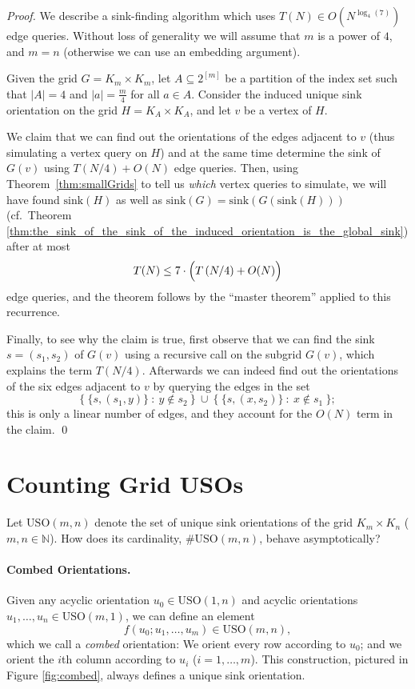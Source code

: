 \documentclass[runningheads,a4paper]{llncs}
\newcommand{\USO}{\ensuremath{\mathrm{USO}}}
\newcommand{\sink}{\ensuremath{\mathrm{sink}}}
\begin{document}
\begin{proof}
    We describe a sink-finding algorithm which uses
    $T(N) \in O(N ^ {\log_4(7)})$ edge queries.
    Without loss of generality we will assume that $m$ is a power of $4$, and
    $m=n$ (otherwise we can use an embedding argument).

    Given the grid $G = K_m \times K_m$, let $A \subseteq 2 ^ {[m]}$
    be a partition of the index set such that
    $|A| = 4$ and $|a| = \frac{m}{4}$ for all $a \in A$.
    Consider the induced unique sink orientation on the grid
    $H = K_A \times K_A$, and let $v$ be a vertex of $H$.

    We claim that we can find out the orientations of the edges adjacent to
    $v$ (thus simulating a vertex query on $H$)
    and at the same time determine the sink of $G(v)$ using
    $T( N/4 ) + O(N)$
    edge queries.
    Then, using Theorem~\ref{thm:smallGrids} to tell us \emph{which} vertex
    queries to simulate, we will have found $\sink(H)$ as well as
    $\sink(G) = \sink(G(\sink(H)))$ (cf.~Theorem
    \ref{thm:the_sink_of_the_sink_of_the_induced_orientation_is_the_global_sink})
    after at most
    \[
        T(N) \le 7 \cdot \Bigl( T \left( N/4 \right) + O(N) \Bigr)
    \]
    edge queries, and the theorem follows by the ``master theorem'' applied to
    this recurrence.

    Finally, to see why the claim is true, first observe that we can find the
    sink $s = (s_1,s_2)$ of $G(v)$ using a recursive call on the subgrid
    $G(v)$, which explains the term $T(N/4)$.
    Afterwards we can indeed find out the orientations of the six edges
    adjacent to $v$ by querying the edges in the set
    \[
        \bigl\{~ \{ s,(s_1,y) \} ~:~ y \notin s_2 ~\bigr\}
        ~\cup~
        \bigl\{~ \{ s,(x,s_2) \} ~:~ x \notin s_1 ~\bigr\};
    \]
    this is only a linear number of edges, and they account for the $O(N)$
    term in the claim.
    \qed
\end{proof}

\section{Counting Grid USOs}
\label{section:counting_unique_sink_orientations}


Let $\USO(m,n)$ denote the set of unique sink orientations of the grid
$K_m \times K_n$ ($m,n \in \mathbb{N}$).
How does its cardinality, $\#\USO(m,n)$, behave asymptotically?

\paragraph{Combed Orientations.}
Given any acyclic orientation $u_0 \in \USO(1,n)$ and acyclic orientations
$u_1,\dots,u_n \in \USO(m,1)$, we can define an element
\[ f(u_0;u_1,\dots,u_m) \in \USO(m,n), \]
which we call a \emph{combed} orientation:
We orient every row according to $u_0$; and we orient the $i$th column
according to $u_i$ ($i = 1,\dots,m$).
This construction, pictured in Figure \ref{fig:combed}, always defines a
unique sink orientation.
\end{document}
